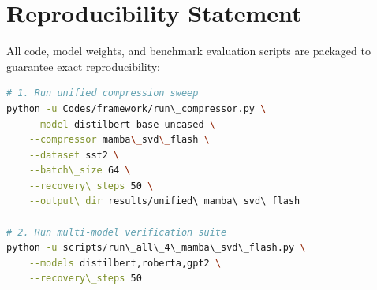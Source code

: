 \section{Reproducibility Statement}
All code, model weights, and benchmark evaluation scripts are packaged to guarantee exact reproducibility:
\begin{lstlisting}[language=bash]
# 1. Run unified compression sweep
python -u Codes/framework/run\_compressor.py \
    --model distilbert-base-uncased \
    --compressor mamba\_svd\_flash \
    --dataset sst2 \
    --batch\_size 64 \
    --recovery\_steps 50 \
    --output\_dir results/unified\_mamba\_svd\_flash

# 2. Run multi-model verification suite
python -u scripts/run\_all\_4\_mamba\_svd\_flash.py \
    --models distilbert,roberta,gpt2 \
    --recovery\_steps 50
\end{lstlisting}
